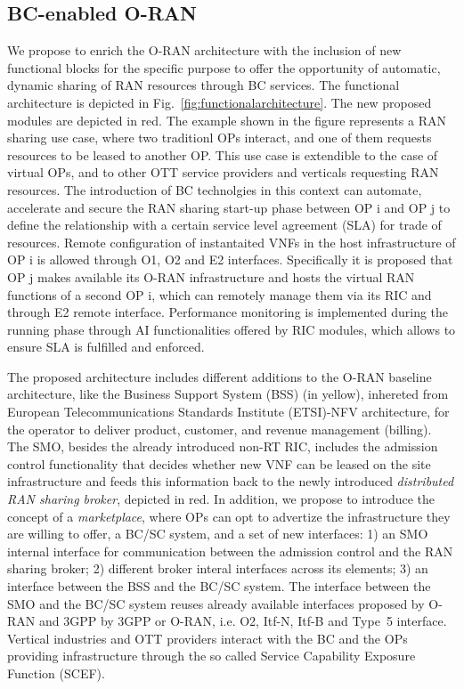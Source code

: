 \documentclass[journal]{IEEEtran}
\begin{document}
\subsection{BC-enabled O-RAN}
We propose to enrich the O-RAN architecture with the inclusion of new functional blocks for the specific purpose to offer the opportunity of automatic, dynamic sharing of RAN resources through BC services. The functional architecture is depicted in Fig.~\ref{fig:functionalarchitecture}. The new proposed modules are depicted in red. The example shown in the figure represents a RAN sharing use case, where two traditionl OPs interact, and one of them requests resources to be leased to another OP. This use case is extendible to the case of virtual OPs, and to other OTT service providers and verticals requesting RAN resources. The introduction of BC technolgies in this context can automate, accelerate and secure the RAN sharing start-up phase between OP i and OP j to define the relationship with a certain service level agreement (SLA) for trade of resources. Remote configuration of instantaited VNFs in the host infrastructure of OP i is allowed through O1, O2 and E2 interfaces. Specifically it is proposed that OP j makes available its {O-RAN} infrastructure and hosts the virtual RAN functions of a second OP i, which can remotely manage them via its RIC and through E2 remote interface. Performance monitoring is implemented during the running phase through AI functionalities offered by RIC modules, which allows to ensure SLA is fulfilled and enforced. 

The proposed architecture includes different additions to the O-RAN baseline architecture, like the Business Support System (BSS) (in yellow), inhereted from European Telecommunications Standards Institute (ETSI)-NFV architecture, for the operator to deliver product, customer, and revenue management (billing). The SMO, besides the already introduced non-RT RIC, includes the admission control functionality that decides whether new VNF can be leased on the site infrastructure and feeds this information back to the newly introduced \textit{distributed RAN sharing broker}, depicted in red. In addition, we propose to introduce the concept of a \textit{marketplace}, where OPs can opt to advertize the infrastructure they are willing to offer, a BC/SC system, and a set of new interfaces: 1) an SMO internal interface for communication between the admission control and the RAN sharing broker; 2) different broker interal interfaces across its elements; 3) an interface between the BSS and the BC/SC system. The interface between the SMO and the BC/SC system reuses already available interfaces proposed by O-RAN and 3GPP by 3GPP or O-RAN, i.e. O2, Itf-N, Itf-B and Type~5 interface. Vertical industries and OTT providers interact with the BC and the OPs providing infrastructure through the so called Service Capability Exposure Function (SCEF).
\end{document}
